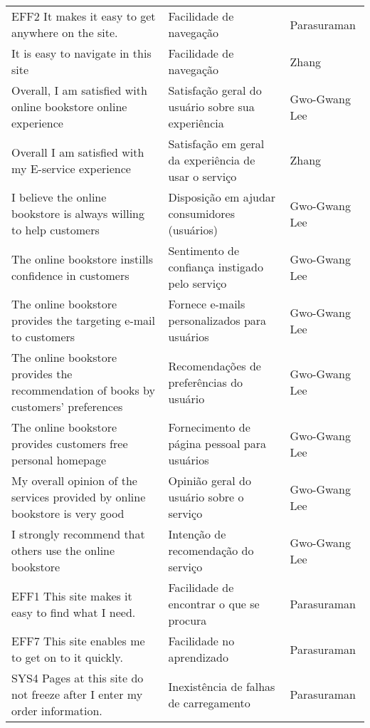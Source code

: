 \begin{apendicesenv}
\begin{table}[]
{\begin{tabular}{|lll|}
EFF2 It makes it easy to get anywhere on the site. & Facilidade de navegação & Parasuraman \\
It is easy to navigate in this site & Facilidade de navegação & Zhang \\ \hline
Overall, I am satisfied with online bookstore online experience & Satisfação geral do usuário sobre sua experiência & Gwo-Gwang Lee \\
Overall I am satisfied with my E-service experience & Satisfação em geral da experiência de usar o serviço & Zhang \\ \hline
\multicolumn{1}{|l|}{I believe the online bookstore is always willing to help customers} & \multicolumn{1}{l|}{Disposição em ajudar consumidores (usuários)} & Gwo-Gwang Lee \\ \hline
\multicolumn{1}{|l|}{The online bookstore instills confidence in customers} & \multicolumn{1}{l|}{Sentimento de confiança instigado pelo serviço} & Gwo-Gwang Lee \\ \hline
\multicolumn{1}{|l|}{The online bookstore provides the targeting e-mail to customers} & \multicolumn{1}{l|}{Fornece e-mails personalizados para usuários} & Gwo-Gwang Lee \\ \hline
\multicolumn{1}{|l|}{The online bookstore provides the recommendation of books by customers’ preferences} & \multicolumn{1}{l|}{Recomendações de preferências do usuário} & Gwo-Gwang Lee \\ \hline
\multicolumn{1}{|l|}{The online bookstore provides customers free personal homepage} & \multicolumn{1}{l|}{Fornecimento de página pessoal para usuários} & Gwo-Gwang Lee \\ \hline
\multicolumn{1}{|l|}{My overall opinion of the services provided by online bookstore is very good} & \multicolumn{1}{l|}{Opinião geral do usuário sobre o serviço} & Gwo-Gwang Lee \\ \hline
\multicolumn{1}{|l|}{I strongly recommend that others use the online bookstore} & \multicolumn{1}{l|}{Intenção de recomendação do serviço} & Gwo-Gwang Lee \\ \hline
\multicolumn{1}{|l|}{EFF1 This site makes it easy to find what I need.} & \multicolumn{1}{l|}{Facilidade de encontrar o que se procura} & Parasuraman \\ \hline
\multicolumn{1}{|l|}{EFF7 This site enables me to get on to it quickly.} & \multicolumn{1}{l|}{Facilidade no aprendizado} & Parasuraman \\ \hline
\multicolumn{1}{|l|}{SYS4 Pages at this site do not freeze after I enter my order information.} & \multicolumn{1}{l|}{Inexistência de falhas de carregamento} & Parasuraman \\ \hline

\end{tabular}}
\end{table}
\end{apendicesenv}
